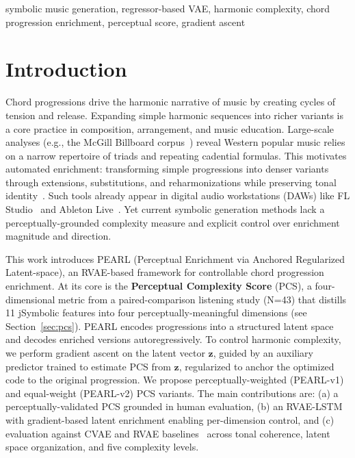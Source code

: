 \documentclass[conference]{IEEEtran}
\begin{document}
\begin{IEEEkeywords}
symbolic music generation, regressor-based VAE, harmonic complexity, chord progression enrichment, perceptual score, gradient ascent
\end{IEEEkeywords}

\section{Introduction}
Chord progressions drive the harmonic narrative of music by creating cycles of tension and release. Expanding simple harmonic sequences into richer variants is a core practice in composition, arrangement, and music education. Large-scale analyses (e.g., the McGill Billboard corpus~\cite{burgoyne2011}) reveal Western popular music relies on a narrow repertoire of triads and repeating cadential formulas. This motivates automated enrichment: transforming simple progressions into denser variants through extensions, substitutions, and reharmonizations while preserving tonal identity~\cite{cecchetti2022hearing}. Such tools already appear in digital audio workstations (DAWs) like FL Studio~\cite{flstudio_manual} and Ableton Live~\cite{ableton_expressive_chords}. Yet current symbolic generation methods lack a perceptually-grounded complexity measure and explicit control over enrichment magnitude and direction.

This work introduces PEARL (Perceptual Enrichment via Anchored Regularized Latent-space), an RVAE-based framework for controllable chord progression enrichment. At its core is the \textbf{Perceptual Complexity Score} (PCS), a four-dimensional metric from a paired-comparison listening study (N=43) that distills 11 jSymbolic features into four perceptually-meaningful dimensions (see Section~\ref{sec:pcs}). PEARL encodes progressions into a structured latent space and decodes enriched versions autoregressively. To control harmonic complexity, we perform gradient ascent on the latent vector $\mathbf{z}$, guided by an auxiliary predictor trained to estimate PCS from $\mathbf{z}$, regularized to anchor the optimized code to the original progression. We propose perceptually-weighted (PEARL-v1) and equal-weight (PEARL-v2) PCS variants. The main contributions are: (a) a perceptually-validated PCS grounded in human evaluation, (b) an RVAE-LSTM with gradient-based latent enrichment enabling per-dimension control, and (c) evaluation against CVAE and RVAE baselines~\cite{comanducci2023vae} across tonal coherence, latent space organization, and five complexity levels.
\end{document}
